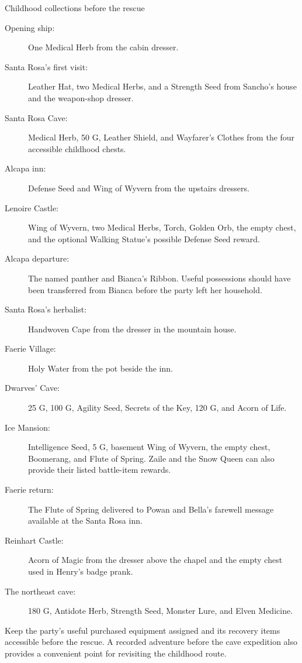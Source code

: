 \begin{routecheck}{Childhood collections before the rescue}
\begin{description}
  \item[Opening ship:] One Medical Herb from the cabin dresser.
  \item[Santa Rosa's first visit:] Leather Hat, two Medical Herbs, and
    a Strength Seed from Sancho's house and the weapon-shop dresser.
  \item[Santa Rosa Cave:] Medical Herb, 50 G, Leather Shield, and
    Wayfarer's Clothes from the four accessible childhood chests.
  \item[Alcapa inn:] Defense Seed and Wing of Wyvern from the upstairs
    dressers.
  \item[Lenoire Castle:] Wing of Wyvern, two Medical Herbs, Torch,
    Golden Orb, the empty chest, and the optional Walking Statue's
    possible Defense Seed reward.
  \item[Alcapa departure:] The named panther and Bianca's Ribbon.
    Useful possessions should have been transferred from Bianca before
    the party left her household.
  \item[Santa Rosa's herbalist:] Handwoven Cape from the dresser in
    the mountain house.
  \item[Faerie Village:] Holy Water from the pot beside the inn.
  \item[Dwarves' Cave:] 25 G, 100 G, Agility Seed, Secrets of the Key,
    120 G, and Acorn of Life.
  \item[Ice Mansion:] Intelligence Seed, 5 G, basement Wing of Wyvern,
    the empty chest, Boomerang, and Flute of Spring. Zaile and the
    Snow Queen can also provide their listed battle-item rewards.
  \item[Faerie return:] The Flute of Spring delivered to Powan and
    Bella's farewell message available at the Santa Rosa inn.
  \item[Reinhart Castle:] Acorn of Magic from the dresser above the
    chapel and the empty chest used in Henry's badge prank.
  \item[The northeast cave:] 180 G, Antidote Herb, Strength Seed,
    Monster Lure, and Elven Medicine.
\end{description}
\end{routecheck}

Keep the party's useful purchased equipment assigned and its recovery
items accessible before the rescue. A recorded adventure before the
cave expedition also provides a convenient point for revisiting the
childhood route.

